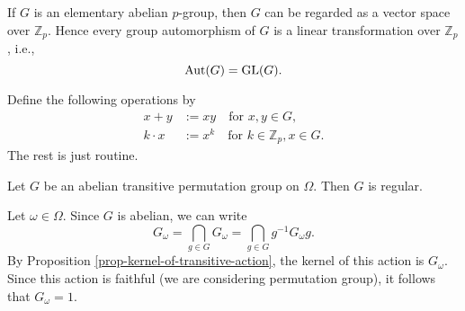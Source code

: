 \begin{lemma} \label{lemma-elem-p-group-is-VS-over-Zp}
	If $G$ is an elementary abelian $p$-group, then $G$ can be regarded as a vector space over $\mathbb{Z}_p$. Hence every group automorphism of $G$ is a linear transformation over $\mathbb{Z}_p$, i.e.,
	\begin{equation*}
		\operatorname{Aut}(G)  =\operatorname{GL}(G).
	\end{equation*}
\end{lemma}
\begin{sketch}
	Define the following operations by
	\begin{align*}
		x+y &:= xy \quad \text{for }x,y\in G,
		\\
		k\cdot x &:= x^k \quad \text{for }k\in \mathbb{Z}_p , x\in G.
	\end{align*}
	The rest is just routine.
\end{sketch}

\begin{lemma} \label{lemma-abel-trans-perm-is-regular}
	Let $G$ be an abelian transitive permutation group on $\Omega$. Then $G$ is regular.
\end{lemma}
\begin{sketch}
	Let $\omega\in \Omega$. Since $G$ is abelian, we can write 
	\begin{equation*}
		G_\omega = \bigcap_{g\in G} G_\omega = \bigcap_{g\in G} g^{-1}G_\omega g.
	\end{equation*}
	By Proposition \ref{prop-kernel-of-transitive-action}, the kernel of this action is $G_\omega$. Since this action is faithful (we are considering permutation group), it follows that $G_\omega = 1$.
\end{sketch}

